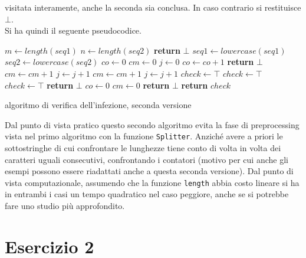 \documentclass[a4paper,12pt, oneside]{book}
\begin{document}
visitata interamente, anche la seconda sia conclusa. In caso contrario si
restituisce $\bot$.\\
Si ha quindi il seguente pseudocodice.
\begin{algorithm}[H]
  \begin{algorithmic}
    \State $m \gets length(seq1)$
    \State $n \gets length(seq2)$
    \State \textbf{return} $\bot$
    \EndIf
    \State $seq1\gets lowercase(seq1)$
    \State $seq2\gets lowercase(seq2)$
    \State $co \gets 0$
    \State $cm \gets 0$
    \State $j \gets 0$
    \State $co \gets co+1$
    \If {$i==n-1$ \textbf{or} $seq1[i]\neq seq[i+1$}
    \State \textbf{return} $\bot$
    \EndIf
    \State $cm \gets cm+1$
    \State $j \gets j+1$
    \EndWhile
    \State $cm \gets cm+1$
    \State $j \gets j+1$
    \State $check \gets \top$
    \State $check \gets \top$
    \State $check \gets \top$
    \Else
    \State  \textbf{return} $\bot$
    \EndIf
    \State $co \gets 0$
    \State $cm \gets 0$
    \State  \textbf{return} $\bot$
    \EndIf
    \EndIf
    \EndFor
    \State \textbf{return} $check$
    \EndFunction
  \end{algorithmic}
  \caption{algoritmo di verifica dell'infezione, seconda versione}
\end{algorithm}
Dal punto di vista pratico questo secondo algoritmo evita la fase di
preprocessing vista nel primo algoritmo con la funzione
\texttt{Splitter}. Anziché avere a priori le sottostringhe di cui confrontare le
lunghezze tiene conto di volta in volta dei caratteri uguali consecutivi,
confrontando i contatori (motivo per cui anche gli esempi possono essere
riadattati anche a questa seconda versione). Dal
punto di vista computazionale, assumendo che la funzione \texttt{length} abbia
costo lineare si ha in entrambi i casi un tempo quadratico nel caso peggiore,
anche se si potrebbe fare uno studio più approfondito. 
\chapter{Esercizio 2}
\end{document}
